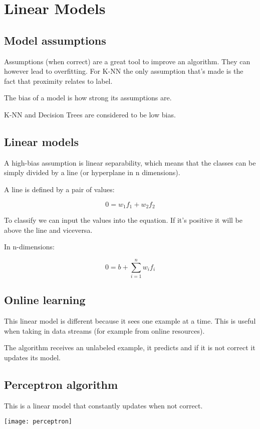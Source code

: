 
\chapter{Linear Models}
\section{Model assumptions}
Assumptions (when correct) are a great tool to improve an algorithm. They can however lead to overfitting. For K-NN the only assumption that's made is the fact that proximity relates to label. 

\begin{definition}[Bias]
	The bias of a model is how strong its assumptions are.
\end{definition}

K-NN and Decision Trees are considered to be low bias. 

\section{Linear models}
A high-bias assumption is linear separability, which means that the classes can be simply divided by a line (or hyperplane in n dimensions).

A line is defined by a pair of values: 

\[
0 = w_1f_1 + w_2f_2
\]

To classify we can input the values into the equation. If it's positive it will be above the line and viceversa.

In n-dimensions: 

\[
0 = b+ \sum_{i=1}^{n} w_if_i
\]

\section{Online learning}

This linear model is different because it sees one example at a time. This is useful when taking in data streams (for example from online resources).

The algorithm receives an unlabeled example, it predicts and if it is not correct it updates its model.

\section{Perceptron algorithm}
This is a linear model that constantly updates when not correct.

\texttt{[image: perceptron]}